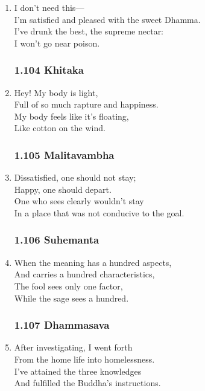 \documentclass[10pt, openany]{book}
\begin{document}
\begin{enumerate}
\item I don’t need this—\\
I’m satisfied and pleased with the sweet Dhamma.\\
I’ve drunk the best, the supreme nectar:\\
I won’t go near poison.

\subsubsection*{1.104 Khitaka}

\item Hey! My body is light,\\
Full of so much rapture and happiness.\\
My body feels like it’s floating,\\
Like cotton on the wind.

\subsubsection*{1.105 Malitavambha}

\item Dissatisfied, one should not stay;\\
Happy, one should depart.\\
One who sees clearly wouldn’t stay\\
In a place that was not conducive to the goal.

\subsubsection*{1.106 Suhemanta}

\item When the meaning has a hundred aspects,\\
And carries a hundred characteristics,\\
The fool sees only one factor,\\
While the sage sees a hundred.

\subsubsection*{1.107 Dhammasava}

\item After investigating, I went forth\\
From the home life into homelessness.\\
I’ve attained the three knowledges\\
And fulfilled the Buddha’s instructions.


\end{enumerate}
\end{document}
